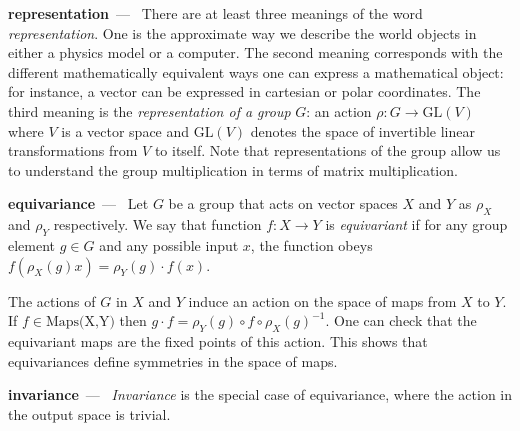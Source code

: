 \documentclass{article}
\renewcommand{\paragraph}[1]{\par\textbf{#1}~---~}
\begin{document}
\paragraph{representation} There are at least three meanings of the word \emph{representation}. One is the approximate way we describe the world objects in either a physics model or a computer. The second meaning corresponds with the different mathematically equivalent ways one can express a mathematical object: for instance, a vector can be expressed in cartesian or polar coordinates. The third meaning is the \emph{representation of a group} $G$: an action $\rho: G\to \text{GL}(V)$ where $V$ is a vector space and $\text{GL}(V)$ denotes the space of invertible linear transformations from $V$ to itself. Note that representations of the group allow us to understand the group multiplication in terms of matrix multiplication.

\paragraph{equivariance}
Let $G$ be a group that acts on vector spaces $X$ and $Y$ as $\rho_X$ and $\rho_Y$ respectively. We say that function $f:X\to Y$ is \emph{equivariant} if for any group element $g\in G$ and any possible input $x$, the function obeys $f( \rho_X(g) x) = \rho_Y(g)\cdot f(x)$.

The actions of $G$ in $X$ and $Y$ induce an action on the space of maps from $X$ to $Y$. If $f\in \text{Maps(X,Y)}$ then $g\cdot f = \rho_Y(g)\circ f \circ \rho_X(g)^{-1}$. One can check that the equivariant maps are the fixed points of this action. This shows that equivariances define symmetries in the space of maps. 


\paragraph{invariance}
\emph{Invariance} is the special case of equivariance, where the action in the output space is trivial.
\end{document}
